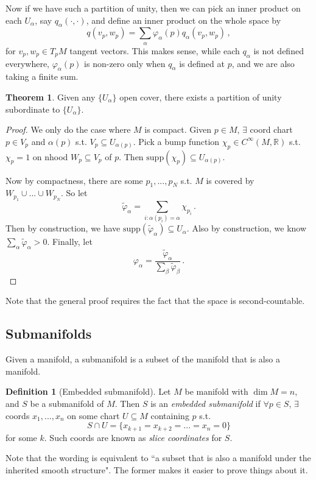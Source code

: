 \documentclass[a4paper,11pt]{article}
\theoremstyle{definition}
\newtheorem*{defn}{Definition}
\newtheorem*{thm}{Theorem}
\numberwithin{equation}{section}
\begin{document}
Now if we have such a partition of unity, then we can pick an inner product on each $U_\alpha$, say $q_\alpha(\cdot,\cdot)$, and define an inner product on the whole space by
\[
q(v_p,w_p)=\sum_\alpha\varphi_\alpha(p)q_\alpha(v_p,w_p)\,,
\]
for $v_p,w_p\in T_pM$ tangent vectors. This makes sense, while each $q_\alpha$ is not defined everywhere,  $\varphi_\alpha(p)$ is non-zero only when $q_\alpha$ is defined at $p$, and we are also taking a finite sum.

\begin{thm}
Given any $\{U_\alpha\}$ open cover, there exists a partition of unity subordinate to $\{U_\alpha\}$.
\end{thm}

\begin{proof}
We only do the case where $M$ is compact. Given $p\in M$, $\exists$ coord chart $p\in V_p$ and $\alpha(p)$ s.t. $V_p\subseteq U_{\alpha(p)}$. Pick a bump function $\chi_p\in C^\infty(M,\mathbb{R})$ s.t. $\chi_p=1$ on nhood $W_p\subseteq V_p$ of $p$. Then $\text{supp}(\chi_p)\subseteq U_{\alpha(p)}$.

Now by compactness, there are some $p_1,...,p_N$ s.t. $M$ is covered by $W_{p_1}\cup...\cup W_{p_N}$. So let
\[
\tilde{\varphi}_\alpha=\sum_{i:\alpha(p_i)=\alpha}\chi_{p_i}\,.
\]
Then by construction, we have $\text{supp}(\tilde{\varphi}_\alpha)\subseteq U_\alpha$. Also by construction, we know $\sum_\alpha\tilde{\varphi}_\alpha>0$. Finally, let
\[
\varphi_\alpha=\frac{\tilde{\varphi}_\alpha}{\sum_\beta\tilde{\varphi}_\beta}\,.
\]
\end{proof}
Note that the general proof requires the fact that the space is second-countable.

\subsection{Submanifolds}
Given a manifold, a submanifold is a subset of the manifold that is also a manifold.

\begin{defn}[Embedded submanifold]
Let $M$ be manifold with $\dim M=n$, and $S$ be a submanifold of $M$. Then $S$ is an \emph{embedded submanifold} if $\forall p\in S$, $\exists$ coords $x_1,...,x_n$ on some chart $U\subseteq M$ containing $p$ s.t.
\[
S\cap U=\{x_{k+1}=x_{k+2}=...=x_n=0\}
\]
for some $k$. Such coords are known as \emph{slice coordinates} for $S$.
\end{defn}
Note that the wording is equivalent to ``a subset that is also a manifold under the inherited smooth structure". The former makes it easier to prove things about it.
\end{document}
